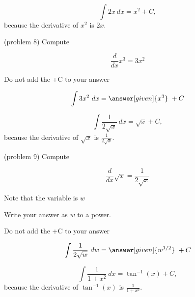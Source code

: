 \documentclass{ximera}
\begin{document}
\begin{example}[example 8]
\[
\int 2x \ dx = x^2 + C,
\]
because the derivative of $x^2$ is $2x$.

\end{example}


\begin{problem}(problem 8)
Compute 

\begin{hint}
\[
\frac{d}{dx} x^3 = 3x^2
\]
\end{hint}
\begin{hint}
\begin{center}
Do not add the +C to your answer
\end{center}
\end{hint}

\[
\int 3x^2 \ dx =
\answer[given]{x^3} \ + C
\]
\end{problem}


\begin{example}[example 9]
\[
\int \frac{1}{2\sqrt x} \ dx = \sqrt x + C,
\]
because the derivative of $\sqrt x$ is $\frac{1}{2\sqrt x}$.

\end{example}



\begin{problem}(problem 9)
Compute 

\begin{hint}
\[
\frac{d}{dx} \sqrt x = \frac{1}{2\sqrt x}
\]
\end{hint}
\begin{hint}
Note that the variable is $w$
\end{hint}
\begin{hint}
Write your answer as $w$ to a power.
\end{hint}
\begin{hint}
\begin{center}
Do not add the +C to your answer
\end{center}
\end{hint}

\[
\int \frac{1}{2\sqrt w} \ dw =
\answer[given]{w^{1/2}} \ + C
\]
\end{problem}



\begin{example}[example 10]
\[
\int \frac{1}{1 + x^2} \ dx = \tan^{-1}(x) + C,
\]
because the derivative 
of $\tan^{-1}(x)$ is $\frac{1}{1 + x^2}$.

\end{example}
\end{document}
